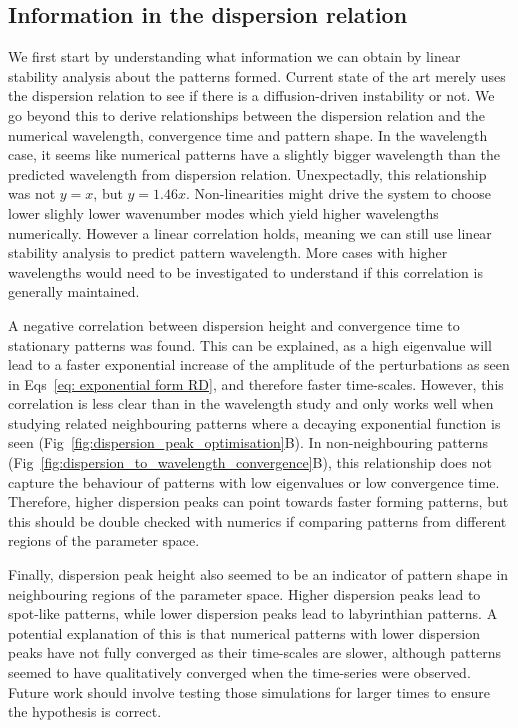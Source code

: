 \subsection*{Information in the dispersion relation}
We first start by understanding what information we can obtain by linear stability analysis about the patterns formed.
Current state of the art merely uses the dispersion relation to see if there is a diffusion-driven instability or not.
We go beyond this to derive relationships between the dispersion relation and the numerical wavelength, convergence time and pattern shape.
In the wavelength case, it seems like numerical patterns have a slightly bigger wavelength than the predicted wavelength from dispersion relation.
Unexpectadly, this relationship was not $y=x$, but $y=1.46x$.
Non-linearities might drive the system to choose lower slighly lower wavenumber modes which yield higher wavelengths numerically.
However a linear correlation holds, meaning we can still use linear stability analysis to predict pattern wavelength.
More cases with higher wavelengths would need to be investigated to understand if this correlation is generally maintained.

A negative correlation between dispersion height and convergence time to stationary patterns was found.
This can be explained, as a high eigenvalue will lead to a faster exponential increase of the amplitude of the perturbations as seen in Eqs~\ref{eq: exponential form RD}, and therefore faster time-scales.
However, this correlation is less clear than in the wavelength study and only works well when studying related neighbouring patterns where a decaying exponential function is seen (Fig~\ref{fig:dispersion_peak_optimisation}B).
In non-neighbouring patterns (Fig~\ref{fig:dispersion_to_wavelength_convergence}B), this relationship does not capture the behaviour of patterns with low eigenvalues or low convergence time.
Therefore, higher dispersion peaks can point towards faster forming patterns, but this should be double checked with numerics if comparing patterns from different regions of the parameter space.

Finally, dispersion peak height also seemed to be an indicator of pattern shape in neighbouring regions of the parameter space.
Higher dispersion peaks lead to spot-like patterns, while lower dispersion peaks lead to labyrinthian patterns.
A potential explanation of this is that numerical patterns with lower dispersion peaks have not fully converged as their time-scales are slower, although patterns seemed to have qualitatively converged when the time-series were observed.
Future work should involve testing those simulations for larger times to ensure the hypothesis is correct.



